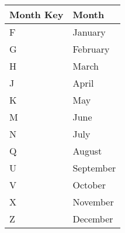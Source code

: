 \begin{tabular}{ll}
\toprule
Month Key &     Month \\
\midrule
        F &   January \\
        G &  February \\
        H &     March \\
        J &     April \\
        K &       May \\
        M &      June \\
        N &      July \\
        Q &    August \\
        U & September \\
        V &   October \\
        X &  November \\
        Z &  December \\
\bottomrule
\end{tabular}
